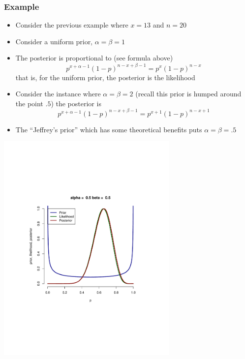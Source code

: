 \documentclass[aspectratio=169]{beamer}
\begin{document}
\begin{frame}\frametitle{Example}
\begin{itemize}
\item Consider the previous example where $x = 13$ and $n=20$
\item Consider a uniform prior, $\alpha = \beta = 1$
\item The posterior is proportional to (see formula above)
$$
p^{x + \alpha - 1} (1 - p)^{n - x + \beta - 1} = p^x (1 - p)^{n-x}
$$
that is, for the uniform prior, the posterior is the likelihood
\item Consider the instance where $\alpha = \beta = 2$ (recall this prior
is humped around the point $.5$) the posterior is
$$
p^{x + \alpha - 1} (1 - p)^{n - x + \beta - 1} = p^{x + 1} (1 - p)^{n-x + 1}
$$
\item The ``Jeffrey's prior'' which has some theoretical benefits
  puts $\alpha = \beta = .5$
\end{itemize}
\end{frame}


\begin{frame}
\includegraphics[width=3.5in]{binBayes1.pdf}
\end{frame}
\end{document}
